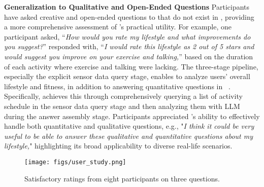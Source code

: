 \textbf{Generalization to Qualitative and Open-Ended Questions}
Participants have asked creative and open-ended questions to \Method that do not exist in \Dataset, providing a more comprehensive assessment of \Method's practical utility.
For example, one participant asked, ``\textit{How would you rate my lifestyle and what improvements do you suggest?}'' \Method responded with, ``\textit{I would rate this lifestyle as 2 out of 5 stars and would suggest you improve on your exercise and talking,}'' based on the duration of each activity where exercise and talking were lacking.
The three-stage pipeline, especially the explicit sensor data query stage, enables \Method to analyze users' overall lifestyle and fitness, in addition to answering quantitative questions in \Dataset~\citesensorqa. 
Specifically, \Method achieves this through comprehensively querying a list of activity schedule in the sensor data query stage and then analyzing them with LLM during the answer assembly stage.
Participants appreciated \Method's ability to effectively handle both quantitative and qualitative questions, e.g., "\textit{I think it could be very useful to be able to answer these qualitative and quantitative questions about my lifestyle,}" highlighting its broad applicability to diverse real-life scenarios.


\begin{figure*}[t]
  \centering
  \texttt{[image: figs/user\_study.png]}
  \vspace{-4mm}
  \caption{Satisfactory ratings from eight participants on three questions.}
  \vspace{-6mm}
  \label{fig:user_study}
\end{figure*}

